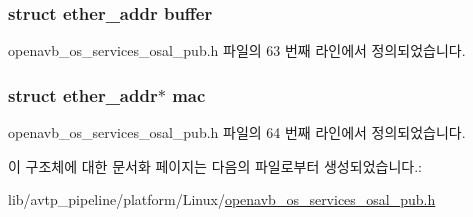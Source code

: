 \subsubsection[{\texorpdfstring{buffer}{buffer}}]{\setlength{\rightskip}{0pt plus 5cm}struct ether\+\_\+addr buffer}\hypertarget{structcfg__mac__t_ab04370ca333258063d83080192e0265d}{}\label{structcfg__mac__t_ab04370ca333258063d83080192e0265d}


openavb\+\_\+os\+\_\+services\+\_\+osal\+\_\+pub.\+h 파일의 63 번째 라인에서 정의되었습니다.

\subsubsection[{\texorpdfstring{mac}{mac}}]{\setlength{\rightskip}{0pt plus 5cm}struct ether\+\_\+addr$\ast$ mac}\hypertarget{structcfg__mac__t_af2bc5d41ceefb37a387542f87c90ccb8}{}\label{structcfg__mac__t_af2bc5d41ceefb37a387542f87c90ccb8}


openavb\+\_\+os\+\_\+services\+\_\+osal\+\_\+pub.\+h 파일의 64 번째 라인에서 정의되었습니다.



이 구조체에 대한 문서화 페이지는 다음의 파일로부터 생성되었습니다.\+:\begin{DoxyCompactItemize}
\item 
lib/avtp\+\_\+pipeline/platform/\+Linux/\hyperlink{openavb__os__services__osal__pub_8h}{openavb\+\_\+os\+\_\+services\+\_\+osal\+\_\+pub.\+h}\end{DoxyCompactItemize}

